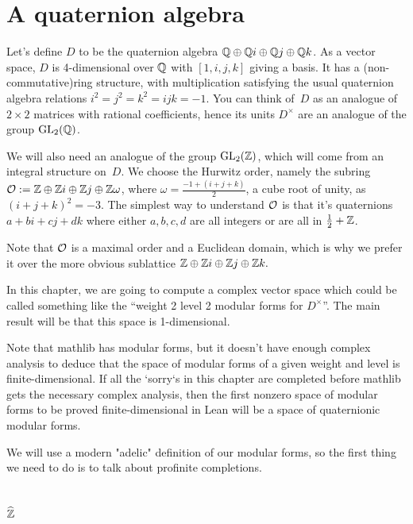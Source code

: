 \section{A quaternion algebra}

Let's define $D$ to be the quaternion algebra $\mathbb{Q}\oplus\mathbb{Q} i\oplus\mathbb{Q} j\oplus\mathbb{Q} k$. As a vector
space, $D$ is 4-dimensional over $\mathbb{Q}$ with $[1,i,j,k]$ giving a basis. It has a (non-commutative)ring structure,
with multiplication satisfying the usual quaternion algebra relations $i^2=j^2=k^2=ijk=-1$.
You can think of~$D$ as an analogue of $2\times 2$
matrices with rational coefficients, hence its units $D^\times$ are an analogue of the
group $\operatorname{GL}_2(\mathbb{Q})$.

We will also need an analogue of the group $\operatorname{GL}_2(\mathbb{Z})$, which will come from an integral structure
on~$D$. We choose the Hurwitz order, namely the subring $\mathcal{O}:=\mathbb{Z}\oplus\mathbb{Z} i\oplus\mathbb{Z} j\oplus\mathbb{Z} \omega$,
where $\omega=\frac{-1+(i+j+k)}{2}$, a cube root of unity, as $(i+j+k)^2=-3$. The simplest way
to understand $\mathcal{O}$ is that it's quaternions $a+bi+cj+dk$ where either $a,b,c,d$ are all integers
or are all in $\frac{1}{2}+\mathbb{Z}$.

Note that $\mathcal{O}$ is a maximal order and a Euclidean domain, which is why we prefer it over the
more obvious sublattice $\mathbb{Z}\oplus\mathbb{Z} i\oplus\mathbb{Z} j\oplus\mathbb{Z} k.$

In this chapter, we are going to compute a complex vector space which could be called something
like the ``weight 2 level 2 modular forms for $D^\times$''. The main result will be that this
space is 1-dimensional.

Note that mathlib has modular forms, but it doesn't have enough complex analysis to deduce
that the space of modular forms of a given weight and level is finite-dimensional. If all
the `sorry`s in this chapter are completed
before mathlib gets the necessary complex analysis, then the first nonzero space of modular forms
to be proved finite-dimensional in Lean will be a space of quaternionic modular forms.

We will use a modern "adelic" definition of our modular forms, so the first thing we need
to do is to talk about profinite completions.

\section{\texorpdfstring{$\widehat{\mathbb{Z}}$}{Zhat}}

